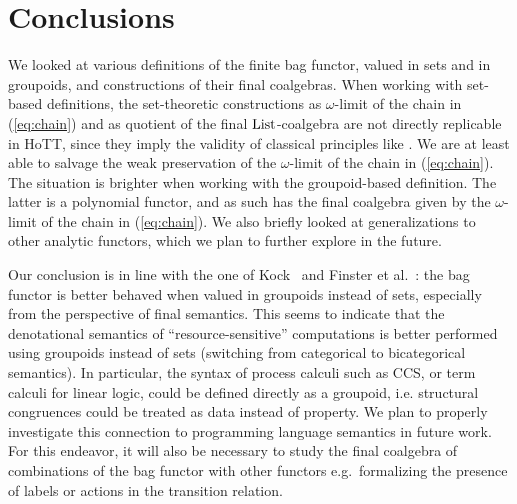 \documentclass[a4paper,USenglish,cleveref]{lipics-v2021}
\begin{document}
\section{Conclusions}

We looked at various definitions of the finite bag functor, valued in sets and in groupoids, and constructions of their final coalgebras. When working with set-based definitions, the set-theoretic constructions as $\omega$-limit of the chain in (\ref{eq:chain}) and as quotient of the final $\List$-coalgebra are not directly replicable in HoTT, since they imply the validity of classical principles like \LLPO{}. We are at least able to salvage the weak preservation of the $\omega$-limit of the chain in (\ref{eq:chain}). The situation is brighter when working with the groupoid-based definition. The latter is a polynomial functor, and as such has the final coalgebra given by the $\omega$-limit of the chain in (\ref{eq:chain}). We also briefly looked at
generalizations to other analytic functors, which we plan to further explore in the future.

Our conclusion is in line with the one of Kock~\cite{Kock2012} and Finster et al.~\cite{Finster2021}: the bag functor is better behaved when valued in groupoids instead of sets, especially from the perspective of final semantics. This seems to indicate that the denotational semantics of ``resource-sensitive'' computations %
is better performed using groupoids instead of sets (switching from categorical to bicategorical semantics).
In particular, the syntax of process calculi such as CCS, or term calculi for linear logic,  could be defined directly as a groupoid, i.e. structural congruences could be treated as data instead of property. We plan to properly investigate this connection to programming language semantics in future work. For this endeavor, it will also be necessary to study the final coalgebra of combinations of the bag functor with other functors e.g.~formalizing the presence of labels or actions in the transition relation.
\end{document}
